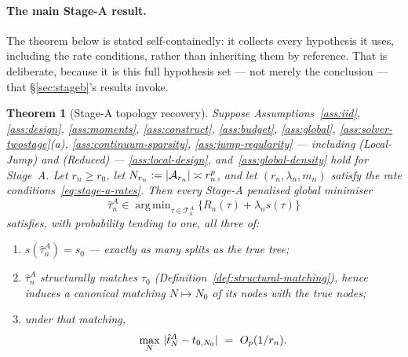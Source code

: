 \documentclass[11pt]{article}
\theoremstyle{plain}
\newtheorem{theorem}{Theorem}[section]
\theoremstyle{definition}
\theoremstyle{remark}
\newcommand{\cA}{\mathcal{A}}
\newcommand{\cT}{\mathcal{T}}
\DeclareMathOperator*{\argmin}{arg\,min}
\DeclarePairedDelimiter{\abs}{\lvert}{\rvert}
\DeclarePairedDelimiter{\card}{\lvert}{\rvert}
\begin{document}
\paragraph{The main Stage-A result.}
The theorem below is stated self-containedly: it collects every hypothesis it
uses, including the rate conditions, rather than inheriting them by reference.
That is deliberate, because it is this full hypothesis set --- not merely the
conclusion --- that \S\ref{sec:stageb}'s results invoke.

\begin{theorem}[Stage-A topology recovery]\label{thm:stagea-topology}
Suppose Assumptions~\ref{ass:iid}, \ref{ass:design},
\ref{ass:moments}, \ref{ass:construct}, \ref{ass:budget},
\ref{ass:global}, \ref{ass:solver-twostage}(a),
\ref{ass:continuum-sparsity}, \ref{ass:jump-regularity} --- including
(Local-Jump) and (Reduced) --- \ref{ass:local-design},
and~\ref{ass:global-density} hold for Stage~A. Let \(r_n\ge r_0\), let
\(N_{r_n}:=\card{\cA_{r_n}}\asymp r_n^p\), and let
\((r_n,\lambda_n,m_n)\) satisfy the rate
conditions~\eqref{eq:stage-a-rates}. Then every Stage-A penalised global
minimiser
\[
  \hat\tau^A_n
  \in
  \argmin_{\tau\in\cT^A_n}\bigl\{R_n(\tau)+\lambda_ns(\tau)\bigr\}
\]
satisfies, with probability tending to one, all three of:
\begin{enumerate}[label=(\roman*),nosep]
  \item \(s(\hat\tau^A_n)=s_0\) --- exactly as many splits as the true tree;
  \item \(\hat\tau^A_n\) structurally matches \(\tau_0\)
  (Definition~\ref{def:structural-matching}), hence induces a canonical
  matching \(N\mapsto N_0\) of its nodes with the true nodes;
  \item under that matching,
  \[
    \max_N\ \abs{\hat t^A_N-t_{0,N_0}}\ =\ O_p(1/r_n).
  \]
\end{enumerate}
\end{theorem}
\end{document}
